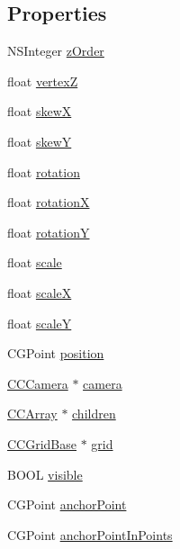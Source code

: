 \subsection*{Properties}
\begin{DoxyCompactItemize}
\item 
N\-S\-Integer \hyperlink{class_c_c_node_a21434541d824d49ea4e84019f1445727}{z\-Order}
\item 
float \hyperlink{class_c_c_node_aad1293ecdafd361d5e62a47e83002835}{vertex\-Z}
\item 
float \hyperlink{class_c_c_node_a3ab54b6652338e7d575ee14971147cbf}{skew\-X}
\item 
float \hyperlink{class_c_c_node_a0adeb25bc880ed50012bdc8c8a811718}{skew\-Y}
\item 
float \hyperlink{class_c_c_node_aecbc1fc81f9adf0ce886644e190e2680}{rotation}
\item 
float \hyperlink{class_c_c_node_a9fd979e8636f47567654cdedbba55d90}{rotation\-X}
\item 
float \hyperlink{class_c_c_node_aab0973f1a68dd4362fc16ff5af4da440}{rotation\-Y}
\item 
float \hyperlink{class_c_c_node_a9c00de8556f267b63055ebd9e55f2415}{scale}
\item 
float \hyperlink{class_c_c_node_af98791d15ad50cac4131dadfec09d49f}{scale\-X}
\item 
float \hyperlink{class_c_c_node_ad19816ebddb7b5da1564e2c97d1361e7}{scale\-Y}
\item 
C\-G\-Point \hyperlink{class_c_c_node_a297b5e96d7c1372d35589a924e1eb286}{position}
\item 
\hyperlink{interface_c_c_camera}{C\-C\-Camera} $\ast$ \hyperlink{class_c_c_node_a14b2b20d96921f92ef12b661f6aeff72}{camera}
\item 
\hyperlink{interface_c_c_array}{C\-C\-Array} $\ast$ \hyperlink{class_c_c_node_a5e739ecda0c314283a89ac389dfca2fa}{children}
\item 
\hyperlink{interface_c_c_grid_base}{C\-C\-Grid\-Base} $\ast$ \hyperlink{class_c_c_node_ae7c8dade03d8bcd244766b97d21ef80f}{grid}
\item 
B\-O\-O\-L \hyperlink{class_c_c_node_a5385156c1a45907c9dff7dfb06e70b45}{visible}
\item 
C\-G\-Point \hyperlink{class_c_c_node_ac24fc742eb11ee96207052639224434c}{anchor\-Point}
\item 
C\-G\-Point \hyperlink{class_c_c_node_a8fd2bad5639f673a56eaf8b9c0302c48}{anchor\-Point\-In\-Points}
\item 

\end{DoxyCompactItemize}
